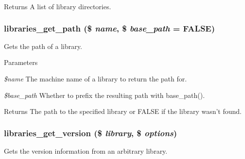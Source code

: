 \begin{DoxyReturn}{Returns}
A list of library directories. 
\end{DoxyReturn}
\hypertarget{libraries_8module_af6582ffdd6b230b9532c8fd007448b2e}{
\subsubsection[{libraries\_\-get\_\-path}]{\setlength{\rightskip}{0pt plus 5cm}libraries\_\-get\_\-path (\$ {\em name}, \/  \$ {\em base\_\-path} = {\ttfamily FALSE})}}
\label{libraries_8module_af6582ffdd6b230b9532c8fd007448b2e}
Gets the path of a library.


\begin{DoxyParams}{Parameters}
\item[{\em \$name}]The machine name of a library to return the path for. \item[{\em \$base\_\-path}]Whether to prefix the resulting path with base\_\-path().\end{DoxyParams}
\begin{DoxyReturn}{Returns}
The path to the specified library or FALSE if the library wasn't found. 
\end{DoxyReturn}
\hypertarget{libraries_8module_a75db4e86addc3ceb4df8d0e1f5a54f99}{
\subsubsection[{libraries\_\-get\_\-version}]{\setlength{\rightskip}{0pt plus 5cm}libraries\_\-get\_\-version (\$ {\em library}, \/  \$ {\em options})}}
\label{libraries_8module_a75db4e86addc3ceb4df8d0e1f5a54f99}
Gets the version information from an arbitrary library.


